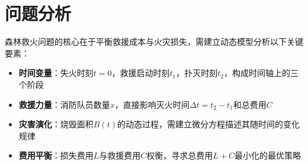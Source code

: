 \section{问题分析}

森林救火问题的核心在于平衡救援成本与火灾损失，需建立动态模型分析以下关键要素：
\begin{itemize}[leftmargin=2em]
    \item \textbf{时间变量}：失火时刻$t=0$，救援启动时刻$t_1$，扑灭时刻$t_2$，构成时间轴上的三个阶段
    \item \textbf{救援力量}：消防队员数量$x$，直接影响灭火时间$\Delta t = t_2 - t_1$和总费用$C$
    \item \textbf{灾害演化}：烧毁面积$B(t)$的动态过程，需建立微分方程描述其随时间的变化规律
    \item \textbf{费用平衡}：损失费用$L$与救援费用$C$权衡，寻求总费用$L + C$最小化的最优策略
\end{itemize}
